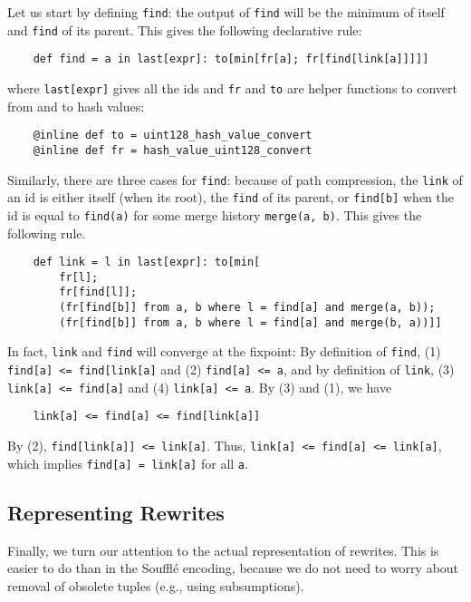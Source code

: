 Let us start by defining \verb|find|:
 the output of \verb|find| will be the minimum of itself 
 and \verb|find| of its parent.
This gives the following declarative rule:

\begin{verbatim}
    def find = a in last[expr]: to[min[fr[a]; fr[find[link[a]]]]]
\end{verbatim}
where \verb|last[expr]| gives all the \eclass ids
 and \verb|fr| and \verb|to| are helper functions to 
 convert from and to hash values:
\begin{verbatim}
    @inline def to = uint128_hash_value_convert
    @inline def fr = hash_value_uint128_convert
\end{verbatim}

Similarly, there are three cases for \verb|find|:
 because of path compression, 
 the \verb|link| of an id is either itself (when its root),
 the \verb|find| of its parent,
 or \verb|find[b]| when the id is equal to \verb|find(a)| 
 for some merge history \verb|merge(a, b)|.
This gives the following rule.
\begin{verbatim}
    def link = l in last[expr]: to[min[
        fr[l];
        fr[find[l]];
        (fr[find[b]] from a, b where l = find[a] and merge(a, b));
        (fr[find[b]] from a, b where l = find[a] and merge(b, a))]]
\end{verbatim}

In fact, \verb|link| and \verb|find| will converge at the fixpoint:
By definition of \verb|find|, (1) \verb|find[a] <= find[link[a]|
 and (2) \verb|find[a] <= a|,
 and by definition of \verb|link|, 
 (3) \verb|link[a] <= find[a]| and (4) \verb|link[a] <= a|.
By (3) and (1), we have 
\begin{verbatim}
    link[a] <= find[a] <= find[link[a]]
\end{verbatim}
By (2), \verb|find[link[a]] <= link[a]|.
Thus, \verb|link[a] <= find[a] <= link[a]|, which implies \verb|find[a] = link[a]|
 for all \verb|a|.

\subsection{Representing Rewrites}

Finally, we turn our attention to the actual representation of rewrites.
This is easier to do than in the Souffl\'e encoding, 
 because we do not need to worry about removal of obsolete tuples 
 (e.g., using subsumptions).

